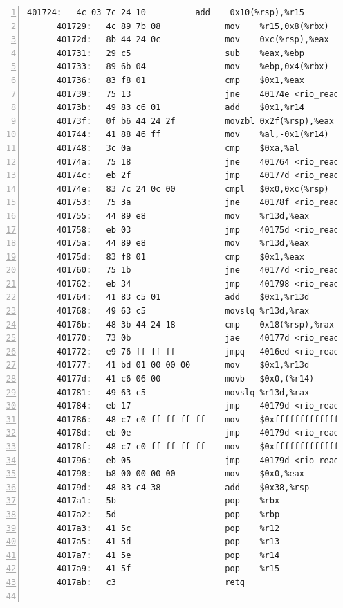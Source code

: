 \documentclass{article}
\begin{document}
\begin{lstlisting}[title = bomb的反汇编代码及部分注释, xleftmargin = 2em,xrightmargin = 2em, aboveskip = 1em, numbers = left, basicstyle=\scriptsize\ttfamily, numberstyle=\scriptsize]
      401724:	4c 03 7c 24 10       	add    0x10(%rsp),%r15
      401729:	4c 89 7b 08          	mov    %r15,0x8(%rbx)
      40172d:	8b 44 24 0c          	mov    0xc(%rsp),%eax
      401731:	29 c5                	sub    %eax,%ebp
      401733:	89 6b 04             	mov    %ebp,0x4(%rbx)
      401736:	83 f8 01             	cmp    $0x1,%eax
      401739:	75 13                	jne    40174e <rio_readlineb+0xc0>
      40173b:	49 83 c6 01          	add    $0x1,%r14
      40173f:	0f b6 44 24 2f       	movzbl 0x2f(%rsp),%eax
      401744:	41 88 46 ff          	mov    %al,-0x1(%r14)
      401748:	3c 0a                	cmp    $0xa,%al
      40174a:	75 18                	jne    401764 <rio_readlineb+0xd6>
      40174c:	eb 2f                	jmp    40177d <rio_readlineb+0xef>
      40174e:	83 7c 24 0c 00       	cmpl   $0x0,0xc(%rsp)
      401753:	75 3a                	jne    40178f <rio_readlineb+0x101>
      401755:	44 89 e8             	mov    %r13d,%eax
      401758:	eb 03                	jmp    40175d <rio_readlineb+0xcf>
      40175a:	44 89 e8             	mov    %r13d,%eax
      40175d:	83 f8 01             	cmp    $0x1,%eax
      401760:	75 1b                	jne    40177d <rio_readlineb+0xef>
      401762:	eb 34                	jmp    401798 <rio_readlineb+0x10a>
      401764:	41 83 c5 01          	add    $0x1,%r13d
      401768:	49 63 c5             	movslq %r13d,%rax
      40176b:	48 3b 44 24 18       	cmp    0x18(%rsp),%rax
      401770:	73 0b                	jae    40177d <rio_readlineb+0xef>
      401772:	e9 76 ff ff ff       	jmpq   4016ed <rio_readlineb+0x5f>
      401777:	41 bd 01 00 00 00    	mov    $0x1,%r13d
      40177d:	41 c6 06 00          	movb   $0x0,(%r14)
      401781:	49 63 c5             	movslq %r13d,%rax
      401784:	eb 17                	jmp    40179d <rio_readlineb+0x10f>
      401786:	48 c7 c0 ff ff ff ff 	mov    $0xffffffffffffffff,%rax
      40178d:	eb 0e                	jmp    40179d <rio_readlineb+0x10f>
      40178f:	48 c7 c0 ff ff ff ff 	mov    $0xffffffffffffffff,%rax
      401796:	eb 05                	jmp    40179d <rio_readlineb+0x10f>
      401798:	b8 00 00 00 00       	mov    $0x0,%eax
      40179d:	48 83 c4 38          	add    $0x38,%rsp
      4017a1:	5b                   	pop    %rbx
      4017a2:	5d                   	pop    %rbp
      4017a3:	41 5c                	pop    %r12
      4017a5:	41 5d                	pop    %r13
      4017a7:	41 5e                	pop    %r14
      4017a9:	41 5f                	pop    %r15
      4017ab:	c3                   	retq   
    

\end{lstlisting}
\end{document}
